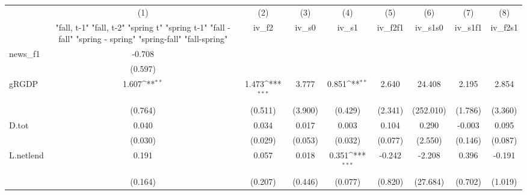 {
\def\sym#1{\ifmmode^{#1}\else\(^{#1}\)\fi}
\begin{tabular}{l*{8}{c}}
\toprule
            &\multicolumn{1}{c}{(1)}&\multicolumn{1}{c}{(2)}&\multicolumn{1}{c}{(3)}&\multicolumn{1}{c}{(4)}&\multicolumn{1}{c}{(5)}&\multicolumn{1}{c}{(6)}&\multicolumn{1}{c}{(7)}&\multicolumn{1}{c}{(8)}\\
            &\multicolumn{1}{c}{  "fall, t-1" "fall, t-2" "spring t" "spring t-1"  "fall - fall" "spring - spring" "spring-fall" "fall-spring" }&\multicolumn{1}{c}{iv\_f2}&\multicolumn{1}{c}{iv\_s0}&\multicolumn{1}{c}{iv\_s1}&\multicolumn{1}{c}{iv\_f2f1}&\multicolumn{1}{c}{iv\_s1s0}&\multicolumn{1}{c}{iv\_s1f1}&\multicolumn{1}{c}{iv\_f2s1}\\
\midrule
news\_f1     &      -0.708         &                     &                     &                     &                     &                     &                     &                     \\
            &     (0.597)         &                     &                     &                     &                     &                     &                     &                     \\
\addlinespace
gRGDP       &       1.607\sym{**} &       1.473\sym{***}&       3.777         &       0.851\sym{**} &       2.640         &      24.408         &       2.195         &       2.854         \\
            &     (0.764)         &     (0.511)         &     (3.900)         &     (0.429)         &     (2.341)         &   (252.010)         &     (1.786)         &     (3.360)         \\
\addlinespace
D.tot       &       0.040         &       0.034         &       0.017         &       0.003         &       0.104         &       0.290         &      -0.003         &       0.095         \\
            &     (0.030)         &     (0.029)         &     (0.053)         &     (0.032)         &     (0.077)         &     (2.550)         &     (0.146)         &     (0.087)         \\
\addlinespace
L.netlend   &       0.191         &       0.057         &       0.018         &       0.351\sym{***}&      -0.242         &      -2.208         &       0.396         &      -0.191         \\
            &     (0.164)         &     (0.207)         &     (0.446)         &     (0.077)         &     (0.820)         &    (27.684)         &     (0.702)         &     (1.019)         \\

\end{tabular}}
